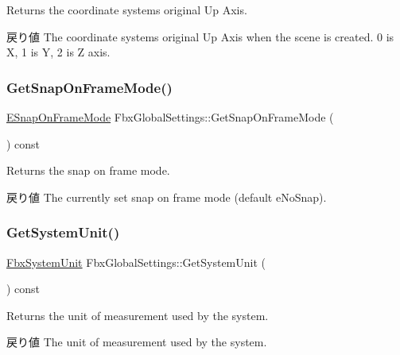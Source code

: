 Returns the coordinate system\textquotesingle{}s original Up Axis. \begin{DoxyReturn}{戻り値}
The coordinate system\textquotesingle{}s original Up Axis when the scene is created. 0 is X, 1 is Y, 2 is Z axis. 
\end{DoxyReturn}
\mbox{\label{class_fbx_global_settings_a2f7b9c64f16aed022e95504944076cf1}} 
\subsubsection{\texorpdfstring{Get\+Snap\+On\+Frame\+Mode()}{GetSnapOnFrameMode()}}
{\footnotesize\ttfamily \hyperlink{class_fbx_global_settings_ada0423e32bb00b73cb43b94d54c54b4a}{E\+Snap\+On\+Frame\+Mode} Fbx\+Global\+Settings\+::\+Get\+Snap\+On\+Frame\+Mode (\begin{DoxyParamCaption}{ }\end{DoxyParamCaption}) const}

Returns the snap on frame mode. \begin{DoxyReturn}{戻り値}
The currently set snap on frame mode (default e\+No\+Snap). 
\end{DoxyReturn}
\mbox{\label{class_fbx_global_settings_af7965a7917aa5a1545597e81ade9c1f0}} 
\subsubsection{\texorpdfstring{Get\+System\+Unit()}{GetSystemUnit()}}
{\footnotesize\ttfamily \hyperlink{class_fbx_system_unit}{Fbx\+System\+Unit} Fbx\+Global\+Settings\+::\+Get\+System\+Unit (\begin{DoxyParamCaption}{ }\end{DoxyParamCaption}) const}

Returns the unit of measurement used by the system. \begin{DoxyReturn}{戻り値}
The unit of measurement used by the system. 
\end{DoxyReturn}
\mbox{\label{class_fbx_global_settings_a1b2f291c9da96c693c79bcd6a4115648}} 
